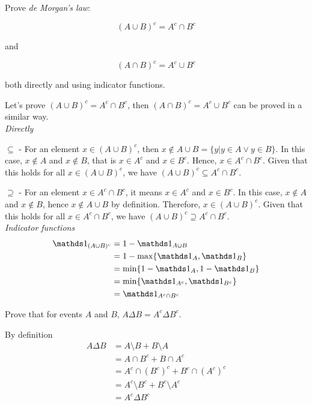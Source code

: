 \begin{exercise}

Prove \textit{de Morgan's law}:

\[ (A \cup B)^c = A^c \cap B^c \]

and

\[ (A \cap B)^c = A^c \cup B^c \]

both directly and using indicator functions.

\end{exercise}
\begin{solution}

Let's prove $(A\cup B)^c = A^c\cap B^c$, then $(A \cap B)^c = A^c \cup B^c$ can be proved in a similar way.\\

\textit{Directly}

$\subseteq$ - For an element $x\in(A\cup B)^c$, then $x\notin A\cup B=\{ y | y\in A \vee y\in B \}$. In this case, $x\notin A$ and $x\notin B$, that is $x\in A^c$ and $x\in B^c$. Hence, $x\in A^c\cap B^c$. Given that this holds for all $x\in(A\cup B)^c$, we have $(A\cup B)^c \subseteq A^c\cap B^c$.

$\supseteq$ - For an element $x\in A^c\cap B^c$, it means $x\in A^c$ and $x\in B^c$. In this case, $x\notin A$ and $x\notin B$, hence $x\notin A\cup B$ by definition. Therefore, $x\in (A\cup B)^c$. Given that this holds for all $x\in A^c\cap B^c$, we have $(A\cup B)^c \supseteq A^c\cap B^c$.\\

\textit{Indicator functions}
\begin{align*}
\dsone_{(A\cup B)^c} &= 1 - \dsone_{A\cup B} \\
  &= 1 - \max\{ \dsone_A, \dsone_B \} \\
  &= \min\{ 1-\dsone_A, 1-\dsone_B \} \\
  &= \min\{ \dsone _{A^c}, \dsone _{B^c} \} \\
  &= \dsone _{A^c\cap B^c}
\end{align*}

\end{solution}


\begin{exercise}

Prove that for events $A$ and $B$, $A\Delta B = A^c \Delta B^c$.

\end{exercise}
\begin{solution}

By definition
\begin{align*}
A\Delta B &= A\setminus B + B\setminus A \\
  &= A\cap B^c + B\cap A^c \\
  &= A^c \cap (B^c)^c + B^c \cap (A^c)^c \\
  &= A^c\setminus B^c + B^c\setminus A^c \\
  &= A^c\Delta B^c
\end{align*}

\end{solution}

